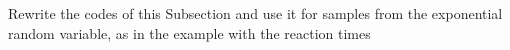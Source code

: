       \begin{ExerciseList}
      	\Exercise Rewrite the codes of this Subsection and use it for samples from the exponential random variable, as in the example with the reaction times 
      \end{ExerciseList}

%      	
